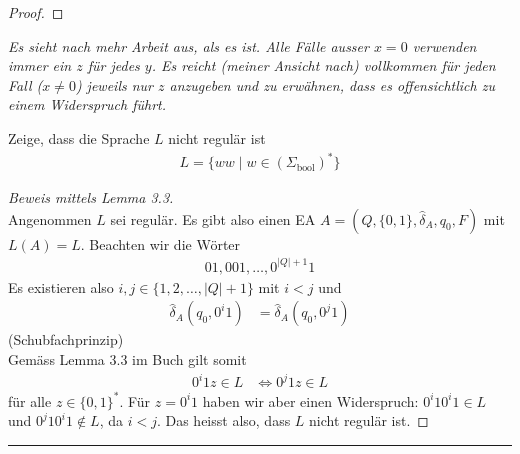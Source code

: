 \documentclass[a4paper,ngerman,12pt]{exam}
\begin{document}
\begin{questions}
\begin{solutionorbox}[20em]
\begin{proof}
    
  \end{proof}
    \textit{Es sieht nach mehr Arbeit aus, als es ist. Alle Fälle
    ausser $x = 0$ verwenden immer ein $z$ für jedes $y$.
    Es reicht (meiner Ansicht nach) vollkommen für jeden Fall ($x \neq 0$)
    jeweils nur $z$ anzugeben und zu erwähnen, dass es offensichtlich zu einem
    Widerspruch führt.}
   \end{solutionorbox}

   \question

   Zeige, dass die Sprache $L$ nicht regulär ist
    \begin{align*}
    L = \{ww \mid w \in \left(\Sigma_{\mathrm{bool}}\right)^*\}
    \end{align*}
     \vspace{-2em}
    \begin{solutionorbox}[22em]
      \begin{proof}[Beweis mittels Lemma 3.3] $ $\\
    Angenommen $L$ sei regulär.
    Es gibt also einen EA $A = (Q, \{0, 1\}, \hat{\delta}_A, q_0, F)$ mit $L(A) = L$.
    Beachten wir die Wörter
    \begin{align*}
      01, 001, \dots , 0^{|Q|+1}1
    \end{align*}
    Es existieren also $i, j \in \{1, 2, \dots, |Q|+1\}$ mit $i < j$
    und
    \begin{align*}
      \hat{\delta}_A(q_0, 0^i1) &= \hat{\delta}_A(q_0, 0^j1)
    \end{align*}
    (Schubfachprinzip)\\
    Gemäss Lemma 3.3 im Buch gilt somit
    \begin{align*}
      0^i1 z \in L &\iff 0^j1 z \in L
    \end{align*}
    für alle $z \in \{0, 1\}^*$. Für $z = 0^i1$ haben wir aber einen Widerspruch:
    $0^i1 0^i1 \in L$ und $0^j1 0^i1 \not\in L$, da $i < j$. Das heisst also, dass
    $L$ nicht regulär ist.
      \end{proof}

      \hrule


\end{solutionorbox}
\end{questions}
\end{document}
